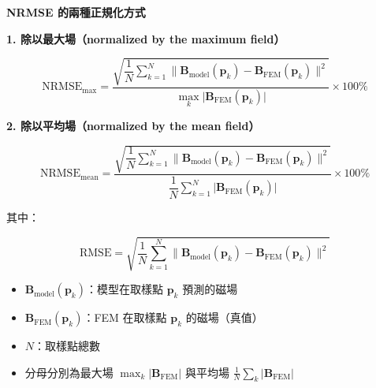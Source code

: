 \documentclass[12pt]{article}
\newcommand{\zh}[1]{{\cjk #1}}
\begin{document}
{\large\textbf{NRMSE \zh{的兩種正規化方式}}}

\vspace{1.5em}

\textbf{1. \zh{除以最大場}（normalized by the maximum field）}

\[
\mathrm{NRMSE}_{\max}
=\frac{\sqrt{\dfrac{1}{N}\displaystyle\sum_{k=1}^{N}
\big\|\mathbf{B}_{\mathrm{model}}(\mathbf{p}_k)-\mathbf{B}_{\mathrm{FEM}}(\mathbf{p}_k)\big\|^{2}}}
{\displaystyle\max_{k}\big|\mathbf{B}_{\mathrm{FEM}}(\mathbf{p}_k)\big|}\times100\%
\]

\vspace{1em}

\textbf{2. \zh{除以平均場}（normalized by the mean field）}

\[
\mathrm{NRMSE}_{\mathrm{mean}}
=\frac{\sqrt{\dfrac{1}{N}\displaystyle\sum_{k=1}^{N}
\big\|\mathbf{B}_{\mathrm{model}}(\mathbf{p}_k)-\mathbf{B}_{\mathrm{FEM}}(\mathbf{p}_k)\big\|^{2}}}
{\dfrac{1}{N}\displaystyle\sum_{k=1}^{N}\big|\mathbf{B}_{\mathrm{FEM}}(\mathbf{p}_k)\big|}\times100\%
\]

\vspace{2em}

\zh{其中}：

\[
\text{RMSE}=\sqrt{\frac{1}{N}\sum_{k=1}^{N}
\big\|\mathbf{B}_{\mathrm{model}}(\mathbf{p}_k)-\mathbf{B}_{\mathrm{FEM}}(\mathbf{p}_k)\big\|^{2}}
\]

\begin{itemize}
\item $\mathbf{B}_{\mathrm{model}}(\mathbf{p}_k)$：\zh{模型在取樣點} $\mathbf{p}_k$ \zh{預測的磁場}
\item $\mathbf{B}_{\mathrm{FEM}}(\mathbf{p}_k)$：\zh{FEM 在取樣點} $\mathbf{p}_k$ \zh{的磁場（真值）}
\item $N$：\zh{取樣點總數}
\item \zh{分母分別為最大場} $\max_k|\mathbf{B}_{\mathrm{FEM}}|$ \zh{與平均場}
      $\frac{1}{N}\sum_k|\mathbf{B}_{\mathrm{FEM}}|$
\end{itemize}
\end{document}
